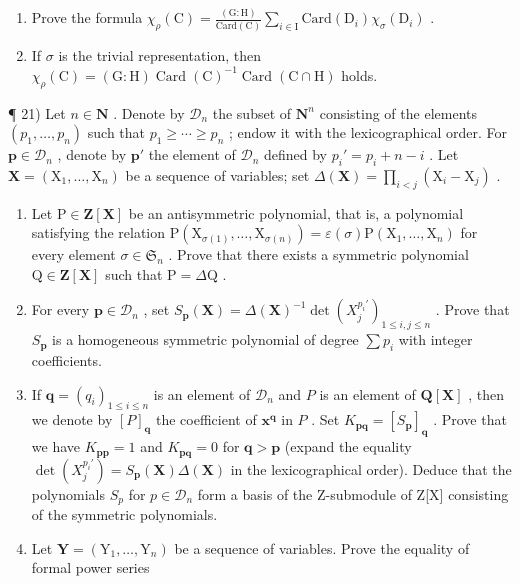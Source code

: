 \begin{enumerate}
\def\labelenumi{\alph{enumi})}
\item
  Prove the formula \(\chi_{\rho}(\mathrm{C}) = \frac{(\mathrm{G:H})}{\mathrm{Card}(\mathrm{C})}\sum_{i\in \mathrm{I}}\mathrm{Card}(\mathrm{D}_i)\chi_\sigma (\mathrm{D}_i)\) .
\item
  If \(\sigma\) is the trivial representation, then \(\chi_{\rho}(\mathrm{C})=(\mathrm{G}:\mathrm{H})\operatorname{Card}(\mathrm{C})^{-1}\operatorname{Card}(\mathrm{C}\cap\mathrm{H})\) holds.
\end{enumerate}

¶ 21) Let \(n \in \mathbf{N}\) . Denote by \(\mathcal{D}_{n}\) the subset of \(\mathbf{N}^{n}\) consisting of the elements \((p_{1},\ldots,p_{n})\) such that \(p_{1} \geqslant \cdots \geqslant p_{n}\) ; endow it with the lexicographical order. For \(\mathbf{p} \in \mathcal{D}_{n}\) , denote by \(\mathbf{p}'\) the element of \(\mathcal{D}_{n}\) defined by \(p_{i}' = p_{i} + n - i\) . Let \(\mathbf{X} = (\mathrm{X}_{1},\ldots,\mathrm{X}_{n})\) be a sequence of variables; set \(\Delta(\mathbf{X}) = \prod_{i<j}(\mathrm{X}_{i} - \mathrm{X}_{j})\) .

\begin{enumerate}
\def\labelenumi{\alph{enumi})}
\item
  Let \(\mathrm{P} \in \mathbf{Z}[\mathbf{X}]\) be an antisymmetric polynomial, that is, a polynomial satisfying the relation \(\mathrm{P}(\mathrm{X}_{\sigma(1)}, \ldots, \mathrm{X}_{\sigma(n)}) = \varepsilon(\sigma)\mathrm{P}(\mathrm{X}_1, \ldots, \mathrm{X}_n)\) for every element \(\sigma \in \mathfrak{S}_n\) . Prove that there exists a symmetric polynomial \(\mathrm{Q} \in \mathbf{Z}[\mathbf{X}]\) such that \(\mathrm{P} = \Delta\mathrm{Q}\) .
\item
  For every \(\mathbf{p} \in \mathcal{D}_n\) , set \(S_{\mathbf{p}}(\mathbf{X}) = \Delta(\mathbf{X})^{-1} \det(X_j^{p_i'})_{1 \leqslant i,j \leqslant n}\) . Prove that \(S_{\mathbf{p}}\) is a homogeneous symmetric polynomial of degree \(\sum p_i\) with integer coefficients.
\item
  If \(\mathbf{q} = (q_i)_{1\leqslant i\leqslant n}\) is an element of \(\mathcal{D}_n\) and \(P\) is an element of \(\mathbf{Q}[\mathbf{X}]\) , then we denote by \([P]_{\mathbf{q}}\) the coefficient of \(\mathbf{x}^{\mathbf{q}}\) in \(P\) . Set \(K_{\mathbf{pq}} = [S_{\mathbf{p}}]_{\mathbf{q}}\) . Prove that we have \(K_{\mathbf{pp}} = 1\) and \(K_{\mathbf{pq}} = 0\) for \(\mathbf{q} > \mathbf{p}\) (expand the equality \(\det(X_j^{p_i'}) = S_{\mathbf{p}}(\mathbf{X})\Delta(\mathbf{X})\) in the lexicographical order). Deduce that the polynomials \(S_{p}\) for \(p \in \mathcal{D}_{n}\) form a basis of the Z-submodule of Z{[}X{]} consisting of the symmetric polynomials.
\item
  Let \(\mathbf{Y} = (\mathrm{Y}_1, \ldots, \mathrm{Y}_n)\) be a sequence of variables. Prove the equality of formal power series
\end{enumerate}

